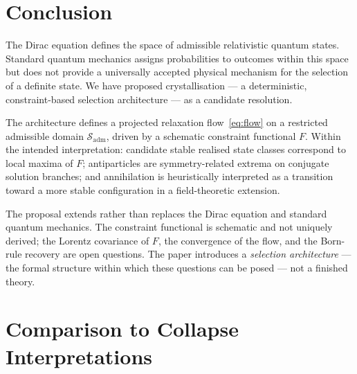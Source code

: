 \documentclass[12pt]{article}
\begin{document}
\section{Conclusion}\label{sec:conclusion}

The Dirac equation defines the space of admissible relativistic quantum states. Standard quantum mechanics assigns probabilities to outcomes within this space but does not provide a universally accepted physical mechanism for the selection of a definite state. We have proposed crystallisation --- a deterministic, constraint-based selection architecture --- as a candidate resolution.

The architecture defines a projected relaxation flow~\eqref{eq:flow} on a restricted admissible domain $\mathcal{S}_{\mathrm{adm}}$, driven by a schematic constraint functional $F$. Within the intended interpretation: candidate stable realised state classes correspond to local maxima of $F$; antiparticles are symmetry-related extrema on conjugate solution branches; and annihilation is heuristically interpreted as a transition toward a more stable configuration in a field-theoretic extension.

The proposal extends rather than replaces the Dirac equation and standard quantum mechanics. The constraint functional is schematic and not uniquely derived; the Lorentz covariance of $F$, the convergence of the flow, and the Born-rule recovery are open questions. The paper introduces a \textit{selection architecture} --- the formal structure within which these questions can be posed --- not a finished theory.

\appendix
\section{Comparison to Collapse Interpretations}\label{app:comparison}
\end{document}
